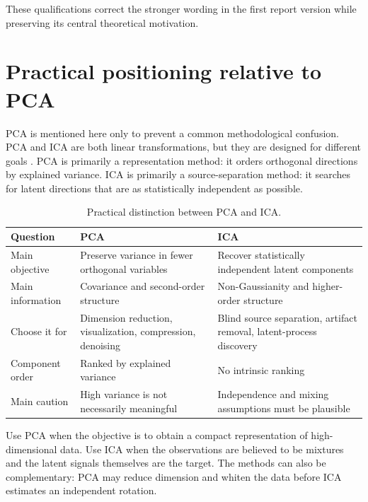 \documentclass[
    paper=a4,
    fontsize=11pt,
    DIV=11,
    parskip=half,
    headings=normal,
    numbers=noendperiod,
    abstract=true,
    titlepage=true
]{scrartcl}
\begin{document}
These qualifications correct the stronger wording in the first report version while preserving its central theoretical motivation.

\clearpage
\section{Practical positioning relative to PCA}

PCA is mentioned here only to prevent a common methodological confusion. PCA and ICA are both linear transformations, but they are designed for different goals \cite{jolliffe2002}. PCA is primarily a representation method: it orders orthogonal directions by explained variance. ICA is primarily a source-separation method: it searches for latent directions that are as statistically independent as possible.

\begin{table}[htbp]
    \centering
    \small
    \caption{Practical distinction between PCA and ICA.}
    \label{tab:pca-ica}
    \begin{tabular}{>{\raggedright\arraybackslash}p{} >{\raggedright\arraybackslash}p{} >{\raggedright\arraybackslash}p{}}
        \toprule
        Question & PCA & ICA \\
        \midrule
        Main objective & Preserve variance in fewer orthogonal variables & Recover statistically independent latent components \\
        Main information & Covariance and second-order structure & Non-Gaussianity and higher-order structure \\
        Choose it for & Dimension reduction, visualization, compression, denoising & Blind source separation, artifact removal, latent-process discovery \\
        Component order & Ranked by explained variance & No intrinsic ranking \\
        Main caution & High variance is not necessarily meaningful & Independence and mixing assumptions must be plausible \\
        \bottomrule
    \end{tabular}
\end{table}

Use PCA when the objective is to obtain a compact representation of high-dimensional data. Use ICA when the observations are believed to be mixtures and the latent signals themselves are the target. The methods can also be complementary: PCA may reduce dimension and whiten the data before ICA estimates an independent rotation.
\end{document}
